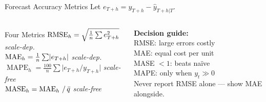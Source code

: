 \documentclass[aspectratio=169, 11pt]{beamer}
\begin{document}
\begin{frame}{Forecast Accuracy Metrics}
  Let $e_{T+h} = y_{T+h} - \hat{y}_{T+h|T}$.
  \begin{columns}[T]
      \begin{definitionbox}{Four Metrics}
        {\small
        $\operatorname{RMSE}_h = \sqrt{\tfrac{1}{n}\sum e_{T+h}^2}$
        \hfill\textit{scale-dep.}\\[3pt]
        $\operatorname{MAE}_h  = \tfrac{1}{n}\sum\lvert e_{T+h}\rvert$
        \hfill\textit{scale-dep.}\\[3pt]
        $\operatorname{MAPE}_h = \tfrac{100}{n}\sum
          \lvert e_{T+h}/y_{T+h}\rvert$
        \hfill\textit{scale-free}\\[3pt]
        $\operatorname{MASE}_h = \operatorname{MAE}_h \,/\, \bar{q}$
        \hfill\textit{scale-free}\\[2pt]
        }
      \end{definitionbox}
      \begin{keybox}
        {\small
        \textbf{Decision guide:}\\[2pt]
        RMSE: large errors costly\\
        MAE: equal cost per unit\\
        MASE $<1$: beats na\"{i}ve\\
        MAPE: only when $y_t \gg 0$\\[3pt]
        Never report RMSE alone ---
        show MAE alongside.
        }
      \end{keybox}
  \end{columns}
\end{frame}
\end{document}
